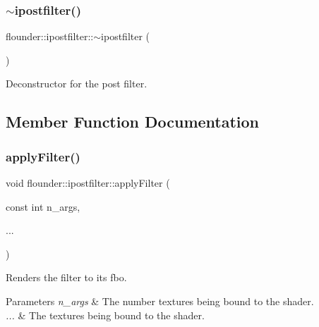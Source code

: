 \subsubsection{\texorpdfstring{$\sim$ipostfilter()}{~ipostfilter()}}
{\footnotesize\ttfamily flounder\+::ipostfilter\+::$\sim$ipostfilter (\begin{DoxyParamCaption}{ }\end{DoxyParamCaption})\hspace{0.3cm}{\ttfamily [virtual]}}



Deconstructor for the post filter. 



\subsection{Member Function Documentation}
\mbox{\label{classflounder_1_1ipostfilter_a34cced83864d9d6b1c664a0337cd97b2}} 
\subsubsection{\texorpdfstring{apply\+Filter()}{applyFilter()}}
{\footnotesize\ttfamily void flounder\+::ipostfilter\+::apply\+Filter (\begin{DoxyParamCaption}\item[{const int}]{n\+\_\+args,  }\item[{}]{... }\end{DoxyParamCaption})}



Renders the filter to its fbo. 


\begin{DoxyParams}{Parameters}
{\em n\+\_\+args} & The number textures being bound to the shader. \\
\hline
{\em ...} & The textures being bound to the shader. \\
\hline
\end{DoxyParams}
\mbox{\label{classflounder_1_1ipostfilter_ae074e279e1e3c6ddea5df8530802b08b}} 
